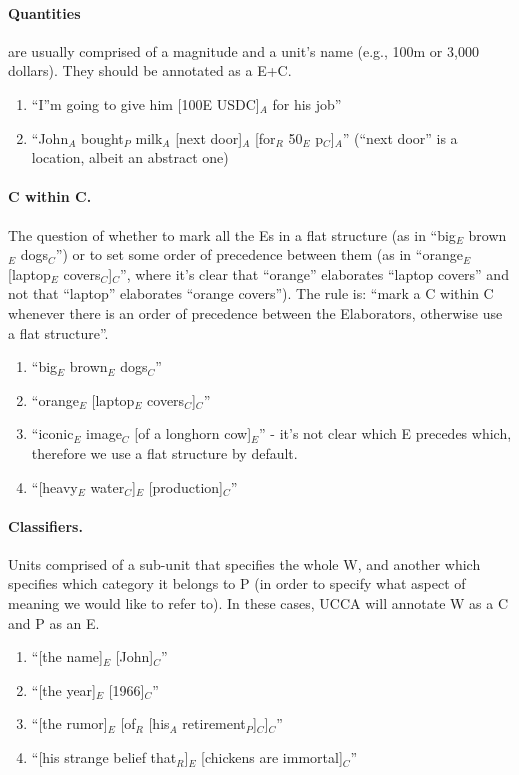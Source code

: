 \documentclass[11pt]{article}
\newcommand{\be}{\begin{enumerate}}
\newcommand{\ee}{\end{enumerate}}
\begin{document}
\paragraph{Quantities} are usually comprised of a magnitude and a unit's name (e.g., 100m or 3,000 dollars). They should be annotated as a E+C.
\be \item
``I''m going to give him [100E USDC]$_A$ for his job''
\item
``John$_A$ bought$_P$ milk$_A$ [next door]$_A$ [for$_R$ 50$_E$ p$_C$]$_A$'' (``next door'' is a location, albeit an abstract one)
\ee

\paragraph{C within C.} The question of whether to mark all the Es in a flat structure (as in ``big$_E$ brown$_E$ dogs$_C$'') or to set some order of precedence between them (as in ``orange$_E$ [laptop$_E$ covers$_C$]$_C$'', where it's clear that ``orange'' elaborates ``laptop covers'' and not that ``laptop'' elaborates ``orange covers''). The rule is: ``mark a C within C whenever there is an order of precedence between the Elaborators, otherwise use a flat structure''.
\be \item
``big$_E$ brown$_E$ dogs$_C$''
\item
``orange$_E$ [laptop$_E$ covers$_C$]$_C$''
\item
``iconic$_E$ image$_C$ [of a longhorn cow]$_E$'' - it's not clear which E precedes which, therefore we use a flat structure by default.
\item
``[heavy$_E$ water$_C$]$_E$ [production]$_C$''
\ee

\paragraph{Classifiers.} Units comprised of a sub-unit that specifies the whole W, and another which specifies which category it belongs to P (in order to specify what aspect of meaning we would like to refer to). In these cases, UCCA will annotate W as a C and P as an E.
\be \item
``[the name]$_E$ [John]$_C$''
\item
``[the year]$_E$ [1966]$_C$''
\item
``[the rumor]$_E$ [of$_R$ [his$_A$ retirement$_P$]$_C$]$_C$''
\item
``[his strange belief that$_R$]$_E$ [chickens are immortal]$_C$''
\ee
\end{document}
